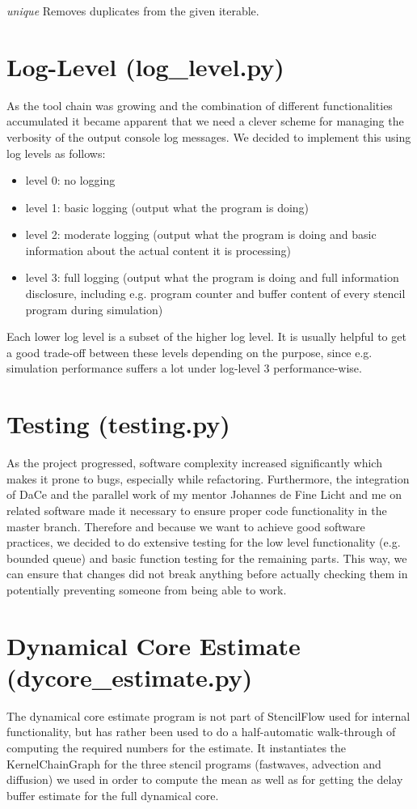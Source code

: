 \textit{unique} Removes duplicates from the given iterable.






\section{Log-Level (log\_level.py)}
As the tool chain was growing and the combination of different functionalities accumulated it became apparent that we need a clever scheme for managing the verbosity of the output console log messages. We decided to implement this using log levels as follows:
\begin{itemize}
	\item level 0: no logging
	\item level 1: basic logging (output what the program is doing)
	\item level 2: moderate logging (output what the program is doing and basic information about the actual content it is processing)
	\item level 3: full logging (output what the program is doing and full information disclosure, including e.g. program counter and buffer content of every stencil program during simulation)
\end{itemize}
Each lower log level is a subset of the higher log level. It is usually helpful to get a good trade-off between these levels depending on the purpose, since e.g. simulation performance suffers a lot under log-level 3 performance-wise.






\section{Testing (testing.py)}
As the project progressed, software complexity increased significantly which makes it prone to bugs, especially while refactoring. Furthermore, the integration of DaCe and the parallel work of my mentor Johannes de Fine Licht and me on related software made it necessary to ensure proper code functionality in the master branch. Therefore and because we want to achieve good software practices, we decided to do extensive testing for the low level functionality (e.g. bounded queue) and basic function testing for the remaining parts. This way, we can ensure that changes did not break anything before actually checking them in potentially preventing someone from being able to work.






\section{Dynamical Core Estimate (dycore\_estimate.py)}
The dynamical core estimate program is not part of StencilFlow used for internal functionality, but has rather been used to do a half-automatic walk-through of computing the required numbers for the estimate. It instantiates the KernelChainGraph for the three stencil programs (fastwaves, advection and diffusion) we used in order to compute the mean as well as for getting the delay buffer estimate for the full dynamical core. 
